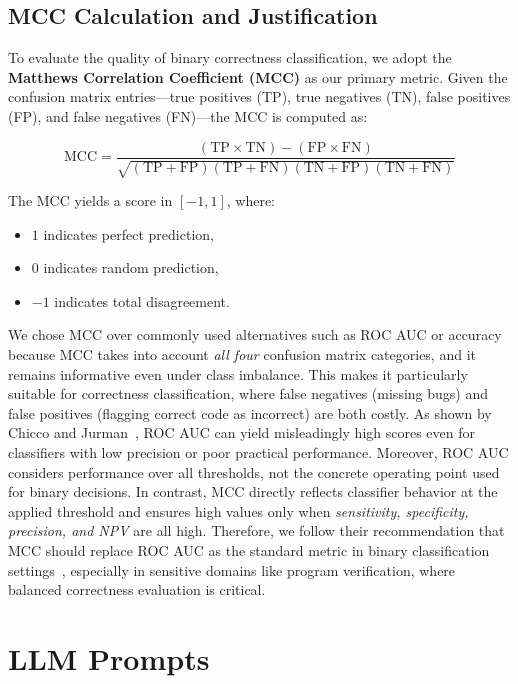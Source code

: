 \documentclass[sigconf]{acmart}
\begin{document}
\subsection{MCC Calculation and Justification}
\label{appendix:mcc}

To evaluate the quality of binary correctness classification, we adopt the \textbf{Matthews Correlation Coefficient (MCC)} as our primary metric. Given the confusion matrix entries—true positives (TP), true negatives (TN), false positives (FP), and false negatives (FN)—the MCC is computed as:

\[
\text{MCC} = \frac{(\text{TP} \times \text{TN}) - (\text{FP} \times \text{FN})}{\sqrt{(\text{TP} + \text{FP})(\text{TP} + \text{FN})(\text{TN} + \text{FP})(\text{TN} + \text{FN})}}
\]

The MCC yields a score in \([-1, 1]\), where:
\begin{itemize}
    \item \(1\) indicates perfect prediction,
    \item \(0\) indicates random prediction,
    \item \(-1\) indicates total disagreement.
\end{itemize}

We chose MCC over commonly used alternatives such as ROC AUC or accuracy because MCC takes into account \emph{all four} confusion matrix categories, and it remains informative even under class imbalance. This makes it particularly suitable for correctness classification, where false negatives (missing bugs) and false positives (flagging correct code as incorrect) are both costly.  As shown by Chicco and Jurman~\cite{mcc}, ROC AUC can yield misleadingly high scores even for classifiers with low precision or poor practical performance. Moreover, ROC AUC considers performance over all thresholds, not the concrete operating point used for binary decisions. In contrast, MCC directly reflects classifier behavior at the applied threshold and ensures high values only when \emph{sensitivity, specificity, precision, and NPV} are all high.
Therefore, we follow their recommendation that MCC should replace ROC AUC as the standard metric in binary classification settings~\cite{mcc}, especially in sensitive domains like program verification, where balanced correctness evaluation is critical.



\onecolumn  %

\section{LLM Prompts}
\end{document}
